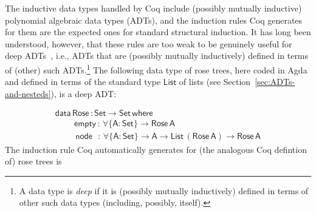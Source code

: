 \documentclass[9pt]{entcs}
\begin{document}
The inductive data types handled by Coq include (possibly mutually
inductive) polynomial algebraic data types (ADTs), and the induction
rules Coq generates for them are the expected ones for standard
structural induction. It has long been understood, however, that these
rules are too weak to be genuinely useful for deep ADTs~\cite{jp20},
i.e., ADTs that are (possibly mutually inductively) defined in terms
of (other) such ADTs.\footnote{A data type is {\em deep} if it is
  (possibly mutually inductively) defined in terms of other such data
  types (including, possibly, itself).}  The following data type of
rose trees, here coded in Agda and defined in terms of the standard
type $\mathsf{List}$ of lists (see
Section~\ref{sec:ADTs-and-nesteds}), is a deep ADT:

\vspace*{-0.2in}

\[\begin{array}{l}
\mathsf{data\, Rose\, : Set \to Set\,where}\\
\mathsf{\;\;\;\;\;\;\;\;empty\, :\,\forall \{A : Set\} \to Rose\,A}\\
\mathsf{\;\;\;\;\;\;\;\;\,node\,\,\,\, :\, \forall \{A : Set\} \to A \to List\,(Rose\,A) \to Rose\,A} 
\end{array}\]
\noindent
The induction rule Coq automatically generates for (the analogous Coq
defintion of) rose trees is

\vspace*{-0.075in}
\end{document}
